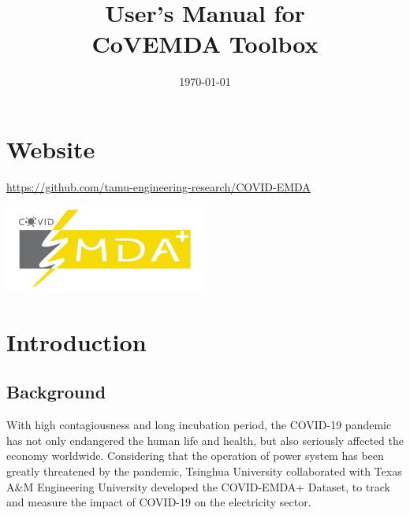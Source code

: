 \documentclass[10pt]{article}
\title{User's Manual for\\\textbf{CoVEMDA Toolbox}}
\author{}
\date{\today}
\numberwithin{equation}{section}
\numberwithin{table}{section}
\numberwithin{figure}{section}
\begin{document}
\makeatletter
\makeatother
\thispagestyle{empty}
\newpage
\tableofcontents
\thispagestyle{empty}


\newpage
\setcounter{page}{1}
\section*{Website}

\url{https://github.com/tamu-engineering-research/COVID-EMDA}

\begin{center}
	\noindent\includegraphics[width=0.5\textwidth]{figures/covid_emda_logo.JPG}
\end{center}



\newpage
\section{Introduction} \label{sec:intro}

\subsection{Background}

With high contagiousness and long incubation period\cite{who2021}, the COVID-19 pandemic has not only endangered the human life and health, but also seriously affected the economy worldwide. Considering that the operation of power system has been greatly threatened by the pandemic, Tsinghua University collaborated with Texas A\&M Engineering University developed the COVID-EMDA+ Dataset, to track and measure the impact of COVID-19 on the electricity sector.
\end{document}
